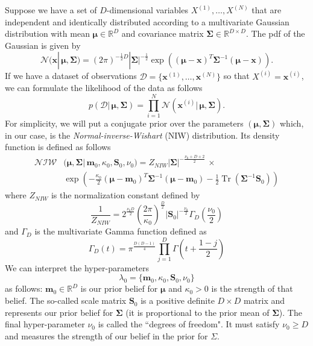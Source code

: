 \documentclass[final,3p,times,twocolumn]{elsarticle}
\DeclareMathOperator*{\Tr}{Tr}
\let\bs\boldsymbol
\begin{document}
Suppose we have a set of $D$-dimensional variables $X^{(1)},\dots,X^{(N)}$ that are independent and identically distributed according to a multivariate Gaussian distribution with mean $\bs\mu \in \mathbb{R}^D$ and covariance matrix $\bs\Sigma \in \mathbb{R}^{D\times D}$. 
The pdf of the Gaussian is given by
\begin{equation}
\mathcal{N}(\bs x|\,\bs\mu,\bs\Sigma) = (2\pi)^{-\frac{1}{2}D}|\bs\Sigma|^{-\frac{1}{2}} \exp \left((\bs\mu-\bs x)^T \bs\Sigma^{-1} (\bs\mu-\bs x) \right).
\end{equation}
If we have a dataset of observations $\mathcal{D} = \{\bs x^{(1)},\dots,\bs x^{(N)}\}$ so that $X^{(i)} = \bs x^{(i)}$, we can formulate the likelihood of the data as follows
\begin{equation}
p(\mathcal{D}|\,\bs\mu,\bs\Sigma) = \prod_{i=1}^N \mathcal{N}(\bs x^{(i)}|\,\bs \mu,\bs \Sigma).
\end{equation}
For simplicity, we will put a conjugate prior over the parameters $(\bs\mu,\bs\Sigma)$ which, in our case, is the \emph{Normal-inverse-Wishart} (NIW) distribution.
Its density function is defined as follows
\begin{equation}
\begin{split}
\mathcal{NIW}&(\bs\mu,\bs\Sigma|\,\bs m_0,\kappa_0,\bs S_0,\nu_0) = Z_{NIW}|\bs\Sigma|^{-\frac{\nu_0+D+2}{2}} \,\times\\
& \exp\left(-\frac{\kappa_0}{2}(\bs\mu-\bs m_0)^T\bs\Sigma^{-1}(\bs\mu-\bs m_0) -\frac{1}{2}\Tr(\bs\Sigma^{-1}\bs S_0) \right)
\end{split}
\end{equation}
where $Z_{NIW}$ is the normalization constant defined by
\begin{equation}
\frac{1}{Z_{NIW}} = 2^{\frac{\nu_0 D}{2}}\left(\frac{2\pi}{\kappa_0}\right)^{\frac{D}{2}}|\bs S_0|^{-\frac{\nu_0}{2}}\Gamma_D \left(\frac{\nu_0}{2}\right)
\end{equation}
and $\Gamma_D$ is the multivariate Gamma function defined as
\begin{equation}
\Gamma_D(t) = \pi^{\frac{D(D-1)}{4}} \prod_{j=1}^D \Gamma\left(t + \frac{1-j}{2}\right)
\end{equation}
We can interpret the hyper-parameters
\begin{equation*}
\lambda_0 = \{\bs m_0,\kappa_0,\bs S_0,\nu_0\}
\end{equation*}
as follows:
$\bs m_0 \in \mathbb{R}^D$ is our prior belief for $\bs \mu$ and $\kappa_0 > 0$ is the strength of that belief.
The so-called scale matrix $\bs S_0$ is a positive definite $D\times D$ matrix and represents our prior belief for $\bs \Sigma$ (it is proportional to the prior mean of $\bs\Sigma$).
The final hyper-parameter $\nu_0$ is called the ``degrees of freedom".
It must satisfy $\nu_0 \geq D$ and measures the strength of our belief in the prior for $\Sigma$.
\end{document}
